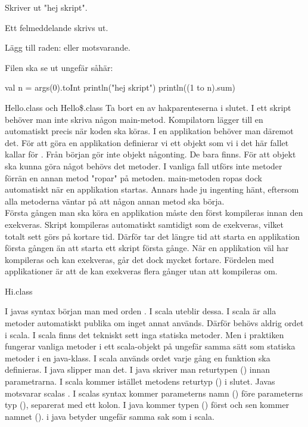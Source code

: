 \Task 

\Subtask Skriver ut "hej skript".

\Subtask Ett felmeddelande skrivs ut.

\Subtask Lägg till raden:
eller motsvarande.

\Subtask Filen ska se ut ungefär såhär: \\
\begin{Code} 
val n = args(0).toInt 
println("hej skript") 
println((1 to n).sum)
\end{Code}

\Subtask {}

\Task 

\Subtask Hello.class och Hello\$.class
\Subtask Ta bort en av hakparenteserna i slutet.
\Subtask I ett skript behöver man inte skriva någon main-metod. Kompilatorn lägger till en automatiskt precis när koden ska köras. I en applikation behöver man däremot det. För att göra en applikation definierar vi ett objekt som vi i det här fallet kallar för . Från början gör inte objekt någonting. De bara finns. För att objekt ska kunna göra något behövs det metoder. I vanliga fall utförs inte metoder förrän en annan metod "ropar" på metoden. main-metoden ropas dock automatiskt när en applikation startas. Annars hade ju ingenting hänt, eftersom alla metoderna väntar på att någon annan metod ska börja. \\
\Subtask Första gången man ska köra en applikation måste den först kompileras innan den exekveras. Skript kompileras automatiskt samtidigt som de exekveras, vilket totalt sett görs på kortare tid. Därför tar det längre tid att starta en applikation första gången än att starta ett skript första gånge. När en applikation väl har kompileras och kan exekveras, går det dock mycket fortare. Fördelen med applikationer är att de kan exekveras flera gånger utan att kompileras om.

\Task 
\Subtask Hi.class

\Subtask I javas syntax början man med orden . I scala uteblir dessa. I scala är alla metoder automatiskt publika om inget annat används. Därför behövs aldrig ordet  i scala. I scala finns det tekniskt sett inga statiska metoder. Men i praktiken fungerar vanliga metoder i ett scala-objekt på ungefär samma sätt som statiska metoder i en java-klass. I scala används ordet  varje gång en funktion ska definieras. I java slipper man det. I java skriver man returtypen () innan parametrarna. I scala kommer istället metodens returtyp () i slutet. Javas  motsvarar scalas . I scalas syntax kommer parameterns namn () före parameterns typ (), separerat med ett kolon. I java kommer typen () först och sen kommer namnet ().  i java betyder ungefär samma sak som  i scala.

